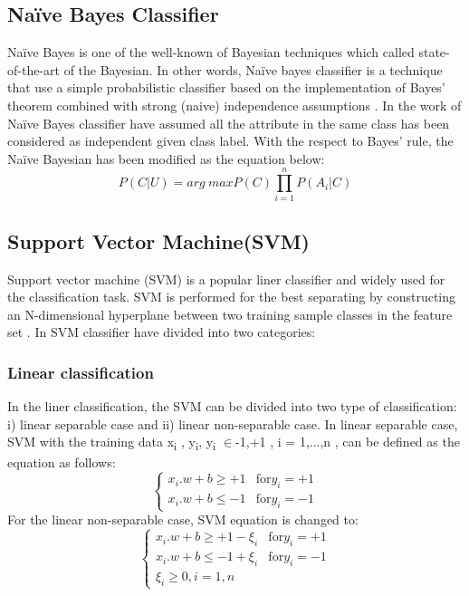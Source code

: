 \documentclass[review]{elsarticle}
\begin{document}
 \subsection{Na\"ive Bayes Classifier}
 	Na\"ive Bayes is one of the well-known of Bayesian techniques which called state-of-the-art of the Bayesian. In  other words, Na\"ive bayes classifier is a technique that use a simple probabilistic classifier based on the implementation of Bayes' theorem combined with strong (naive) independence assumptions \cite{Lowd2005}. In the work of Na\"ive Bayes classifier have assumed all the attribute in the same class has been considered as independent given class label. With the respect to Bayes’ rule, the Na\"ive Bayesian has been modified as the equation below:
 	\begin{equation}
 	P(C|U) = arg\ max P(C) \prod_{i=1}^n P(A_i|C)
 	\end{equation}
 	
\subsection{Support Vector Machine(SVM)}
 	Support vector machine (SVM) is a popular liner classifier and widely used for the classification task. SVM is performed for the best separating by constructing an N-dimensional hyperplane between two training sample classes in the feature set \cite{Cortes1995}. In SVM classifier have divided into two categories: \\

 		\subsubsection{Linear classification}
 		In the liner classification, the SVM can be divided into two type of classification: i) linear separable case and ii) linear non-separable case. 
 		In linear separable case, SVM with the training data {x\textsubscript{i} , y\textsubscript{i}}, y\textsubscript{i}  $\in${-1,+1} , i = 1,...,n ,  can be defined as the equation as follows: 
 		\begin{equation}
 		\left\{ \begin{array}{rcl}
 		x_i . w + b \geq +1 & \mbox{for} 
 		y_i = +1 \\ x_i . w + b \leq -1 & \mbox{for}	y_i = -1
 		
 		\end{array}\right.
 		\end{equation}
 		For the linear non-separable case, SVM equation is changed to: 
 		\begin{equation}
 		\left\{ \begin{array}{rcl}
 		x_i . w + b \geq +1 - \xi_i & \mbox{for} 
 		y_i = +1 \\ x_i . w + b \leq -1 +\xi_i & \mbox{for}	y_i = -1 \\ \xi_i \geq 0, i=1,n
 		
 		\end{array}\right.
 		\end{equation}
 		
\end{document}
